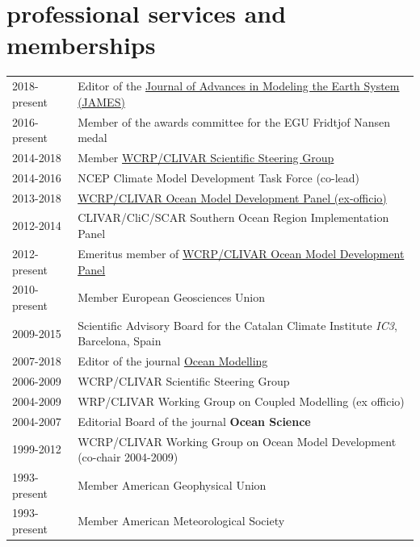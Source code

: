 \documentclass{article}
\begin{document}
\section*{\sc  \color{Maroon}  professional services and memberships}
\vspace{-.25cm}

\begin{tabular}{ll}
2018-present & Editor of the  \href{http://agupubs.onlinelibrary.wiley.com/hub/journal/10.1002/(ISSN)1942-2466/editorial-board/editorial-board.html}{Journal of Advances in Modeling the Earth System (JAMES)}  \\
  2016-present & Member of the awards committee for the EGU Fridtjof Nansen medal 
  \\
2014-2018 &  Member  \href{http://www.clivar.org/organization/ssg}{WCRP/CLIVAR Scientific Steering Group} \\
2014-2016     & NCEP Climate Model Development Task Force (co-lead) \\
2013-2018 & \href{http://www.clivar.org/clivar-panels/omdp}{WCRP/CLIVAR Ocean Model Development Panel (ex-officio)} \\
2012-2014     & CLIVAR/CliC/SCAR Southern Ocean Region Implementation Panel \\
2012-present & Emeritus member of \href{http://www.clivar.org/clivar-panels/omdp}{WCRP/CLIVAR Ocean Model Development Panel} \\
2010-present & Member European Geosciences Union \\
2009-2015     &  Scientific Advisory Board for the Catalan  Climate Institute {\it IC3}, Barcelona, Spain \\
2007-2018 & Editor of the journal \href{https://www.journals.elsevier.com/ocean-modelling/editorial-board}{Ocean Modelling}  \\
2006-2009     &  WCRP/CLIVAR Scientific Steering Group \\
2004-2009     &  WRP/CLIVAR Working Group on Coupled Modelling (ex officio) \\
2004-2007     & Editorial Board of the journal {\bf Ocean Science} \\
1999-2012     & WCRP/CLIVAR Working Group on Ocean Model Development  (co-chair 2004-2009) \\
1993-present  & Member American Geophysical Union \\
1993-present  & Member American Meteorological Society \\
\end{tabular}
\end{document}
